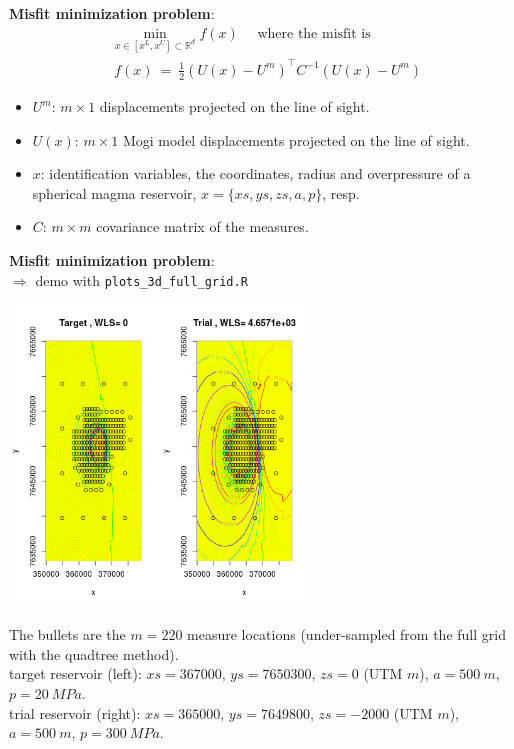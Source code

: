 \begin{frame}{}
\textbf{Misfit minimization problem}:
\begin{equation*}
\begin{split}
& \min_{x \in [x^L,x^U] \subset \mathds{R}^d} f(x) \quad \text{ where the misfit is}\\
& ~ f(x) ~=~\frac{1}{2} (U(x) - U^{m})^\top C^{-1} (U(x) - U^{m})
\end{split}
\end{equation*}
\begin{itemize}
\item $U^m$: $m \times 1$ displacements projected on the line of sight.
\item $U(x)$: $m \times 1$ Mogi model displacements projected on the line of sight.
\item $x$: identification variables, the coordinates, radius and overpressure of a spherical magma reservoir, $x = \{xs,ys,zs,a,p\}$, resp.
\item $C$: $m \times m$ covariance matrix of the measures.
\end{itemize}
\end{frame}

\begin{frame}{}
\textbf{Misfit minimization problem}: \\
$\Rightarrow$ demo with \texttt{plots\_3d\_full\_grid.R}
\begin{center}
\includegraphics[width=0.6\textwidth,height=0.6\textheight]{1_stat_models/figures/contour_ulos_compare}
\end{center}
{\tiny The bullets are the $m=220$ measure locations (under-sampled from the full grid with the quadtree method). \\ 
target reservoir (left): $xs= 367000$, $ys= 7650300$, $zs=0$ (UTM $m$), $a=500~m$, $p=20~MPa$.\\
trial reservoir (right): $xs= 365000$, $ys= 7649800$, $zs=-2000$ (UTM $m$), $a=500~m$, $p=300~MPa$.\\
}
\end{frame}

